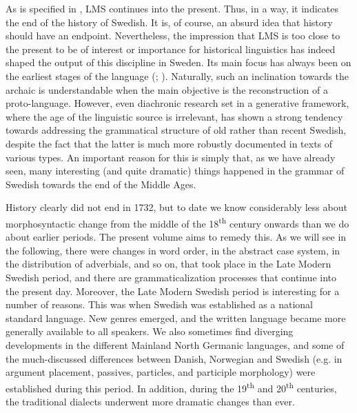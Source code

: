 \documentclass[output=paper]{langscibook}
\begin{document}
As is specified in , LMS continues into the present. Thus, in a way, it indicates the end of the history of Swedish. It is, of course, an absurd idea that history should have an endpoint. Nevertheless, the impression that LMS is too close to the present to be of interest or importance for historical linguistics has indeed shaped the output of this discipline in Sweden. Its main focus has always been on the earliest stages of the language (\citealt{Wollin1988}; \citealt{Haapamaki2010}). Naturally, such an inclination towards the archaic is understandable when the main objective is the reconstruction of a proto-language. However, even diachronic research set in a generative framework, where the age of the linguistic source is irrelevant, has shown a strong tendency towards addressing the grammatical structure of old rather than recent Swedish, despite the fact that the latter is much more robustly documented in texts of various types. An important reason for this is simply that, as we have already seen, many interesting (and quite dramatic) things happened in the grammar of Swedish towards the end of the Middle Ages.



History clearly did not end in 1732, but to date we know considerably less about morphosyntactic change from the middle of the 18\textsuperscript{th} century onwards than we do about earlier periods. The present volume aims to remedy this. As we will see in the following, there were changes in word order, in the abstract case system, in the distribution of adverbials, and so on, that took place in the Late Modern Swedish period, and there are grammaticalization processes that continue into the present day. Moreover, the Late Modern Swedish period is interesting for a number of reasons. This was when Swedish was established as a national standard language. New genres emerged, and the written language became more generally available to all speakers. We also sometimes find diverging developments in the different Mainland North Germanic languages, and some of the much-discussed differences between Danish, Norwegian and Swedish (e.g. in argument placement, passives, particles, and participle morphology) were established during this period. In addition, during the 19\textsuperscript{th} and 20\textsuperscript{th} centuries, the traditional dialects underwent more dramatic changes than ever. 
\end{document}
